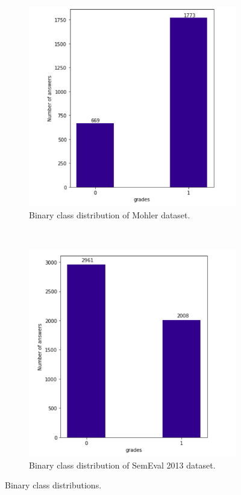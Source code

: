     \begin{figure}
    	\centering
    	\begin{subfigure}[b]{0.4\textwidth}
    		\includegraphics[scale=0.3]{images/mohler_binary_dist}
    		\caption{Binary class distribution of Mohler dataset.}
    		\label{mm_binary_dist}
    	\end{subfigure}
	    ~
	    \begin{subfigure}[b]{0.4\textwidth}
	    	\includegraphics[scale=0.3]{images/semeval_binary_dist}
	    	\caption{Binary class distribution of SemEval 2013 dataset.}
	    	\label{semeval_binary_dist}
	    \end{subfigure}
	    \caption{Binary class distributions.}
    \end{figure}
    
